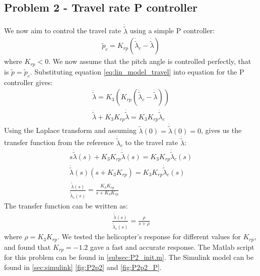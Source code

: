 \subsection{Problem 2 - Travel rate P controller}
We now aim to control the travel rate $\dot{\tilde{\lambda}}$ using a simple P controller:
\begin{gather*}
    \tilde{p}_c = K_{rp}(\dot{\tilde{\lambda}}_c - \dot{\tilde{\lambda}})
    \label{eq:p-controller}
\end{gather*}
where $K_{rp} < 0$. We now assume that the pitch angle is controlled perfectly, that is $\tilde{p} = \tilde{p}_c$. Substituting equation \eqref{eq:lin_model_travel} into equation for the P controller gives:
\begin{gather*}
    \ddot{\tilde{\lambda}} = K_3(K_{rp}(\dot{\tilde{\lambda}}_c - \dot{\tilde{\lambda}})) \\ 
    \ddot{\tilde{\lambda}} + K_3K_{rp}\dot{\tilde{\lambda}} = K_3K_{rp}\dot{\tilde{\lambda}}_c
\end{gather*}
Using the Laplace transform and assuming  $\tilde{\lambda}(0) = \dot{\tilde{\lambda}}(0) = 0$, gives us the transfer function from the reference $\dot{\tilde{\lambda}}_c$ to the travel rate $\dot{\tilde{\lambda}}$:
\begin{gather*}
    s\dot{\tilde{\lambda}}(s) + K_3K_{rp}\dot{\tilde{\lambda}}(s) = K_3K_{rp}\dot{\tilde{\lambda}}_c(s) \\
    \dot{\tilde{\lambda}}(s)(s + K_3K_{rp}) = K_3K_{rp}\dot{\tilde{\lambda}}_c(s) \\
    \frac{\dot{\tilde{\lambda}}(s)}{\dot{\tilde{\lambda}}_c(s)} = \frac{K_3K_{rp}}{s + K_3K_{rp}}
\end{gather*}
The transfer function can be written as:
\begin{gather*}
    \frac{ \dot{\tilde{\lambda}}(s)}{\dot{\tilde{\lambda}}_c(s)} = \frac{\rho}{s + \rho}
\end{gather*}
where $\rho = K_3K_{rp}$. We tested the helicopter's response for different values for $K_{rp}$, and found that $K_{rp} = -1.2$ gave a fast and accurate response. The Matlab script for this problem can be found in \cref{subsec:P2_init.m}. The Simulink model can be found in \cref{sec:simulink} \cref{fig:P2p2} and \cref{fig:P2p2_P}. 